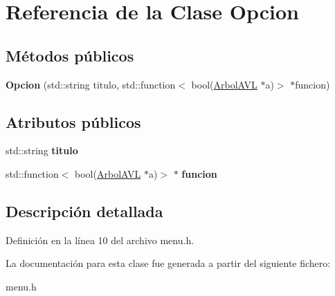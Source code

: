\hypertarget{classOpcion}{}\section{Referencia de la Clase Opcion}
\label{classOpcion}
\subsection*{Métodos públicos}
\begin{DoxyCompactItemize}
\item 
\mbox{\label{classOpcion_aca1ec1590d4a27e91615ec8af53d2824}} 
{\bfseries Opcion} (std\+::string titulo, std\+::function$<$ bool(\hyperlink{classArbolAVL}{Arbol\+A\+VL} $\ast$a)$>$ $\ast$funcion)
\end{DoxyCompactItemize}
\subsection*{Atributos públicos}
\begin{DoxyCompactItemize}
\item 
\mbox{\label{classOpcion_a1d02b7f92549a27f96d434111ede0056}} 
std\+::string {\bfseries titulo}
\item 
\mbox{\label{classOpcion_a11149c2d9df3732dfb83727f9df76f05}} 
std\+::function$<$ bool(\hyperlink{classArbolAVL}{Arbol\+A\+VL} $\ast$a)$>$ $\ast$ {\bfseries funcion}
\end{DoxyCompactItemize}


\subsection{Descripción detallada}


Definición en la línea 10 del archivo menu.\+h.



La documentación para esta clase fue generada a partir del siguiente fichero\+:\begin{DoxyCompactItemize}
\item 
menu.\+h\end{DoxyCompactItemize}
